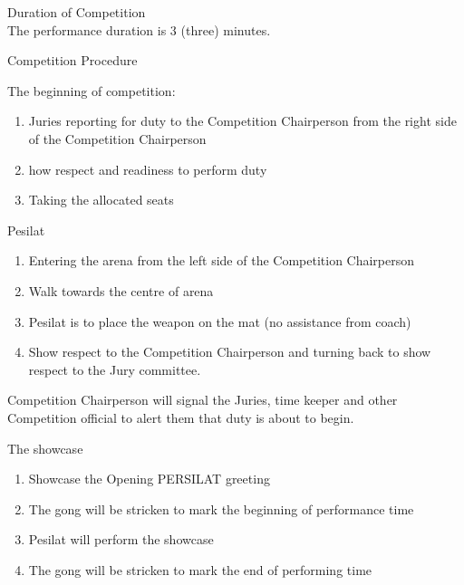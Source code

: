\begin{legal}
\item Duration of Competition \\

      The performance duration is 3 (three) minutes.

\item Competition Procedure
    \begin{legal}
    \item The beginning of competition:
        \begin{enumerate}[label=\alph*.]
        \item Juries reporting for duty to the Competition Chairperson from the right side of the 
              Competition Chairperson
        \item how respect and readiness to perform duty
        \item Taking the allocated seats
        \end{enumerate}

    \item Pesilat
        \begin{enumerate}[label=\alph*.]
        \item Entering the arena from the left side of the Competition Chairperson
        \item Walk towards the centre of arena
        \item Pesilat is to place the weapon on the mat (no assistance from coach)
        \item Show respect to the Competition Chairperson and turning back to show respect to the Jury committee.
        \end{enumerate}

    \item Competition Chairperson will signal the Juries, time keeper and other Competition official to alert them that duty is about to begin.

    \item The showcase
        \begin{enumerate}[label=\alph*.]
        \item Showcase the Opening PERSILAT greeting
        \item The gong will be stricken to mark the beginning of performance time
        \item Pesilat will perform the showcase
        \item The gong will be stricken to mark the end of performing time
        \end{enumerate}


\end{legal}
\end{legal}
